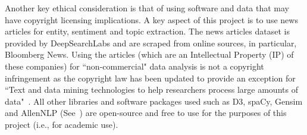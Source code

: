 Another key ethical consideration is that of using software and data that may have copyright licensing implications. A key aspect of this project is to use news articles for entity, sentiment and topic extraction. The news articles dataset is provided by DeepSearchLabs and are scraped from online sources, in particular, Bloomberg News. Using the articles (which are an Intellectual Property (IP) of these companies) for ``non-commercial" data analysis is not a copyright infringement as the copyright law has been updated to provide an exception for ``Text and data mining technologies to help researchers process large amounts of data"~\cite{exceptions_to_copyright}. All other libraries and software packages used such as D3, spaCy, Gensim and AllenNLP (See~) are open-source and free to use for the purposes of this project (i.e., for academic use).